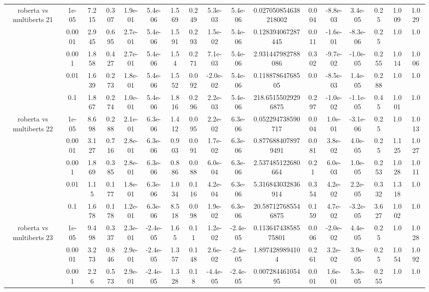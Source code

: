 \begin{tabular}{|c|c|c|c|c|c|c|c|c|c|c|c|c|c|c|c|c|}
\hline
\multirow{5}{*}{roberta  vs multiberts 21} & 1e-05 & 7.215 & 0.307 & 1.9e-01 & 5.4e-06 & 1.569 & 0.249 & 5.3e-03 & 5.4e-06 & 0.027050854638218002 & 0.004 & -8.8e-03 & 3.4e-05 & 0.25 & 1.009 & 1.029 \\
 & 0.0001 & 2.945 & 0.695 & 2.7e-01 & 5.4e-06 & 1.591 & 0.293 & 1.5e-02 & 5.4e-06 & 0.128394067287445 & 0.011 & -1.6e-01 & -8.3e-06 & 0.25 & 1.0 & 1.0 \\
 & 0.001 & 1.858 & 0.427 & 2.7e-01 & 5.4e-06 & 1.54 & 0.271 & 7.1e-03 & 5.4e-06 & 2.931447982788086 & 0.302 & -9.7e-02 & -1.0e-05 & 0.255 & 1.014 & 1.006 \\
 & 0.01 & 1.639 & 0.273 & 1.8e-01 & 5.4e-06 & 1.552 & 0.092 & -2.0e-02 & 5.4e-06 & 0.11887864768505 & 0.0 & -8.5e-03 & 1.4e-05 & 0.288 & 1.0 & 1.0 \\
 & 0.1 & 1.867 & 0.274 & 1.0e-01 & 5.4e-06 & 1.816 & 0.296 & 2.2e-03 & 5.4e-06 & 218.65155029296875 & 0.297 & -1.0e-02 & -1.1e-05 & 0.45 & 1.001 & 1.0 \\
\hline
\multirow{5}{*}{roberta  vs multiberts 22} & 1e-05 & 8.698 & 0.288 & 2.1e-01 & 6.3e-06 & 1.412 & 0.095 & 2.2e-02 & 6.3e-06 & 0.052294738590717 & 0.004 & 1.0e-01 & -3.1e-06 & 0.25 & 1.0 & 1.013 \\
 & 0.0001 & 3.127 & 0.716 & 2.8e-01 & 6.3e-06 & 0.903 & 0.091 & 1.7e-02 & 6.3e-06 & 0.8776884078979491 & 0.081 & 3.8e-02 & 4.0e-05 & 0.25 & 1.125 & 1.027 \\
 & 0.001 & 1.869 & 0.385 & 2.8e-01 & 6.3e-06 & 0.886 & 0.088 & 6.0e-04 & 6.3e-06 & 2.537485122680664 & 0.21 & 6.0e-03 & 1.0e-05 & 0.253 & 1.028 & 1.011 \\
 & 0.01 & 1.15 & 0.177 & 1.8e-01 & 6.3e-06 & 1.034 & 0.116 & 4.2e-04 & 6.3e-06 & 5.316843032836914 & 0.354 & 4.2e-02 & 2.2e-05 & 0.332 & 1.318 & 1.0 \\
 & 0.1 & 1.678 & 0.178 & 1.2e-01 & 6.3e-06 & 8.518 & 0.098 & 1.9e-02 & 6.3e-06 & 20.587127685546875 & 0.159 & 4.7e-02 & -3.2e-05 & 3.627 & 1.002 & 1.0 \\
\hline
\multirow{5}{*}{roberta  vs multiberts 23} & 1e-05 & 9.498 & 0.337 & 2.3e-01 & -2.4e-05 & 1.65 & 0.11 & 1.2e-02 & -2.4e-05 & 0.11364743858575801 & 0.006 & -2.0e-02 & 4.4e-05 & 0.25 & 1.0 & 1.028 \\
 & 0.0001 & 3.273 & 0.846 & 2.9e-01 & -2.4e-05 & 1.357 & 0.148 & 2.6e-02 & -2.4e-05 & 1.8974289894104 & 0.261 & 3.2e-02 & 3.9e-05 & 0.25 & 1.054 & 1.092 \\
 & 0.001 & 2.26 & 0.573 & 2.9e-01 & -2.4e-05 & 1.328 & 0.18 & -4.4e-05 & -2.4e-05 & 0.00728446105495 & 0.001 & 1.6e-01 & 5.3e-05 & 0.255 & 1.0 & 1.0 \\

\end{tabular}
